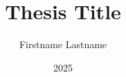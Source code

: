 \newcommand{\cim}{Thesis Title}
\newcommand{\szerzoNev}{Firstname Lastname}
\newcommand{\evSzam}{2025}

\title{\cim}
\author{\szerzoNev}
\date{\evSzam}

\def\szakdolgozat{Szakdolgozat}
